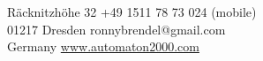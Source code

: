 {\Huge \name}
\vspace{0.5cm}

R\"acknitzh\"ohe 32 \hfill +49 1511 78 73 024 (mobile)\\
01217 Dresden \hfill ronnybrendel@gmail.com\\
Germany \hfill \href{http://www.automaton2000.com}{www.automaton2000.com}

\vspace{0.6cm}

